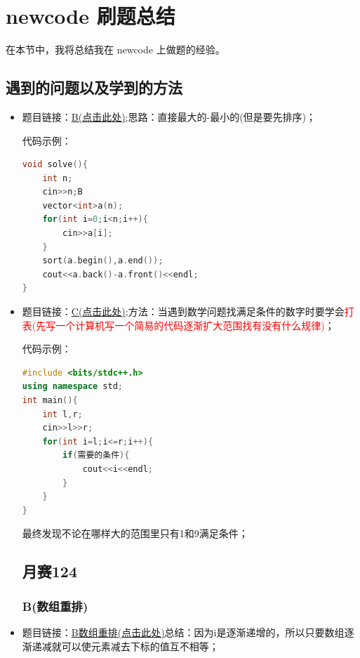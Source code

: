 \section{newcode 刷题总结}
在本节中，我将总结我在 newcode 上做题的经验。

\subsection{遇到的问题以及学到的方法}
\begin{itemize}
\subsection{周赛119}
\item 题目链接：\href{https://ac.nowcoder.com/acm/contest/122724/B}{B(点击此处)};思路：直接最大的-最小的(但是要先排序)；
	
代码示例：\\
\begin{lstlisting}[language=C++]
void solve(){
	int n;
	cin>>n;B
	vector<int>a(n);
	for(int i=0;i<n;i++){
		cin>>a[i];
	}
	sort(a.begin(),a.end());
	cout<<a.back()-a.front()<<endl;
}
\end{lstlisting}
\item 题目链接：\href{https://ac.nowcoder.com/acm/contest/122724/C}{C(点击此处)};方法：当遇到数学问题找满足条件的数字时要学会\textcolor{red}{打表(先写一个计算机写一个简易的代码逐渐扩大范围找有没有什么规律)}；
	
代码示例：\\
\begin{lstlisting}[language=C++]
#include <bits/stdc++.h>
using namespace std;
int main(){
	int l,r;
	cin>>l>>r;
	for(int i=l;i<=r;i++){
		if(需要的条件){
			cout<<i<<endl;
		}
	}
}
\end{lstlisting}
最终发现不论在哪样大的范围里只有1和9满足条件；
\subsection{月赛124}
\subsubsection{B(数组重排)}
\item 题目链接：\href{https://ac.nowcoder.com/acm/contest/123787/B}{B数组重排(点击此处)}总结：因为i是逐渐递增的，所以只要数组逐渐递减就可以使元素减去下标的值互不相等；
	

\end{itemize}
